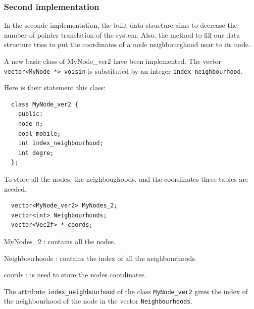 \subsubsection{Second implementation}
In the seconde implementation, the built data structure aims to decrease
the number of pointer translation of the system. Also, the method to fill
our data structure tries to put the coordinates of a node neighbourghood
near to its node.

A new basic class of MyNode\_ver2 have been implemented. The vector \\
\verb+vector<MyNode *> voisin+ is substituted by an integer \verb+index_neighbourhood+.

Here is their statement this class:

\newpage
\begin{lstlisting}
  class MyNode_ver2 {
    public:
    node n;
    bool mobile;
    int index_neighbourhood;
    int degre;
  };
\end{lstlisting}

To store all the nodes, the neighboughoods, and the coordinates three tables are needed. 

\begin{lstlisting}
  vector<MyNode_ver2> MyNodes_2;
  vector<int> Neighbourhoods;
  vector<Vec2f> * coords;
\end{lstlisting}

\begin{dinglist}{70}
\item[MyNodes\_2]: contains all the nodes.
\item[Neighbourhoods]: contains the index of all the neighbourhoods.
\item[coords]: is used to store the nodes coordinates. 
\end{dinglist}

The attribute \verb+index_neighbourhood+ of the class \verb+MyNode_ver2+
gives the index of the neighbourhood of the node in the vector \verb+Neighbourhoods+.

